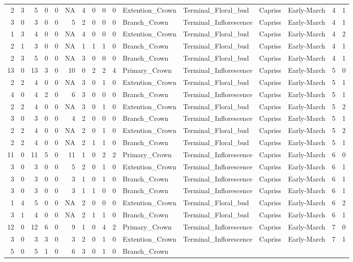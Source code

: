 \documentclass[]{article}
\begin{document}
\begin{longtable}[]{@{}rrrrrrrrrrllllrl@{}}
2 & 3 & 5 & 0 & 0 & NA & 4 & 0 & 0 & 0 & Extention\_Crown &
Terminal\_Floral\_bud & Capriss & Early-March & 4 & 1\tabularnewline
3 & 0 & 3 & 0 & 0 & 5 & 2 & 0 & 0 & 0 & Branch\_Crown &
Terminal\_Inflorescence & Capriss & Early-March & 4 & 1\tabularnewline
1 & 3 & 4 & 0 & 0 & NA & 4 & 0 & 0 & 0 & Extention\_Crown &
Terminal\_Floral\_bud & Capriss & Early-March & 4 & 2\tabularnewline
2 & 1 & 3 & 0 & 0 & NA & 1 & 1 & 1 & 0 & Branch\_Crown &
Terminal\_Floral\_bud & Capriss & Early-March & 4 & 1\tabularnewline
2 & 3 & 5 & 0 & 0 & NA & 3 & 0 & 0 & 0 & Branch\_Crown &
Terminal\_Floral\_bud & Capriss & Early-March & 4 & 1\tabularnewline
13 & 0 & 13 & 3 & 0 & 10 & 0 & 2 & 2 & 4 & Primary\_Crown &
Terminal\_Inflorescence & Capriss & Early-March & 5 & 0\tabularnewline
2 & 2 & 4 & 0 & 0 & NA & 3 & 0 & 1 & 0 & Extention\_Crown &
Terminal\_Floral\_bud & Capriss & Early-March & 5 & 1\tabularnewline
4 & 0 & 4 & 2 & 0 & 6 & 3 & 0 & 0 & 0 & Branch\_Crown &
Terminal\_Inflorescence & Capriss & Early-March & 5 & 1\tabularnewline
2 & 2 & 4 & 0 & 0 & NA & 3 & 0 & 1 & 0 & Extention\_Crown &
Terminal\_Floral\_bud & Capriss & Early-March & 5 & 2\tabularnewline
3 & 0 & 3 & 0 & 0 & 4 & 2 & 0 & 0 & 0 & Branch\_Crown &
Terminal\_Inflorescence & Capriss & Early-March & 5 & 1\tabularnewline
2 & 2 & 4 & 0 & 0 & NA & 2 & 0 & 1 & 0 & Extention\_Crown &
Terminal\_Floral\_bud & Capriss & Early-March & 5 & 2\tabularnewline
2 & 2 & 4 & 0 & 0 & NA & 2 & 1 & 1 & 0 & Branch\_Crown &
Terminal\_Floral\_bud & Capriss & Early-March & 5 & 1\tabularnewline
11 & 0 & 11 & 5 & 0 & 11 & 1 & 0 & 2 & 2 & Primary\_Crown &
Terminal\_Inflorescence & Capriss & Early-March & 6 & 0\tabularnewline
3 & 0 & 3 & 0 & 0 & 5 & 2 & 0 & 1 & 0 & Extention\_Crown &
Terminal\_Inflorescence & Capriss & Early-March & 6 & 1\tabularnewline
3 & 0 & 3 & 0 & 0 & 3 & 1 & 0 & 1 & 0 & Branch\_Crown &
Terminal\_Inflorescence & Capriss & Early-March & 6 & 1\tabularnewline
3 & 0 & 3 & 0 & 0 & 3 & 1 & 1 & 0 & 0 & Branch\_Crown &
Terminal\_Inflorescence & Capriss & Early-March & 6 & 1\tabularnewline
1 & 4 & 5 & 0 & 0 & NA & 2 & 0 & 0 & 0 & Extention\_Crown &
Terminal\_Floral\_bud & Capriss & Early-March & 6 & 2\tabularnewline
3 & 1 & 4 & 0 & 0 & NA & 2 & 1 & 1 & 0 & Branch\_Crown &
Terminal\_Floral\_bud & Capriss & Early-March & 6 & 1\tabularnewline
12 & 0 & 12 & 6 & 0 & 9 & 1 & 0 & 4 & 2 & Primary\_Crown &
Terminal\_Inflorescence & Capriss & Early-March & 7 & 0\tabularnewline
3 & 0 & 3 & 3 & 0 & 3 & 2 & 0 & 1 & 0 & Extention\_Crown &
Terminal\_Inflorescence & Capriss & Early-March & 7 & 1\tabularnewline
5 & 0 & 5 & 1 & 0 & 6 & 3 & 0 & 1 & 0 & Branch\_Crown &

\end{longtable}
\end{document}
